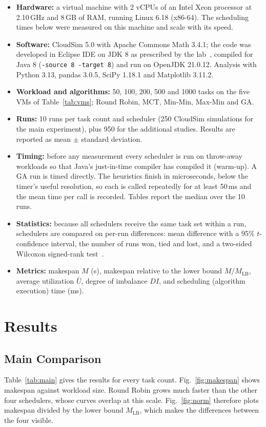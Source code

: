 \documentclass[journal,onecolumn,12pt]{IEEEtran}
\newcommand{\MLB}{M_{\mathrm{LB}}}
\newcommand{\Ubar}{\bar{U}}
\begin{document}
\begin{itemize}
\item \textbf{Hardware:} a virtual machine with 2 vCPUs of an Intel Xeon processor at 2.10\,GHz and 8\,GB of RAM, running Linux 6.18 (x86-64). The scheduling times below were measured on this machine and scale with its speed.
\item \textbf{Software:} CloudSim 5.0 with Apache Commons Math 3.4.1; the code was developed in Eclipse IDE on JDK 8 as prescribed by the lab~\cite{panda}, compiled for Java 8 (\texttt{-source 8 -target 8}) and run on OpenJDK 21.0.12. Analysis with Python 3.13, pandas 3.0.5, SciPy 1.18.1 and Matplotlib 3.11.2.
\item \textbf{Workload and algorithms:} 50, 100, 200, 500 and 1000 tasks on the five VMs of Table~\ref{tab:vms}; Round Robin, MCT, Min-Min, Max-Min and GA.
\item \textbf{Runs:} 10 runs per task count and scheduler (250 CloudSim simulations for the main experiment), plus 950 for the additional studies. Results are reported as mean $\pm$ standard deviation.
\item \textbf{Timing:} before any measurement every scheduler is run on throw-away workloads so that Java's just-in-time compiler has compiled it (warm-up). A GA run is timed directly. The heuristics finish in microseconds, below the timer's useful resolution, so each is called repeatedly for at least 50\,ms and the mean time per call is recorded. Tables report the median over the 10 runs.
\item \textbf{Statistics:} because all schedulers receive the same task set within a run, schedulers are compared on per-run differences: mean difference with a 95\% $t$-confidence interval, the number of runs won, tied and lost, and a two-sided Wilcoxon signed-rank test~\cite{wilcoxon}.
\item \textbf{Metrics:} makespan $M$ (s), makespan relative to the lower bound $M/\MLB$, average utilization $\Ubar$, degree of imbalance $DI$, and scheduling (algorithm execution) time (ms).
\end{itemize}

\section{Results}\label{sec:results}

\subsection{Main Comparison}
Table~\ref{tab:main} gives the results for every task count. Fig.~\ref{fig:makespan} shows makespan against workload size. Round Robin grows much faster than the other four schedulers, whose curves overlap at this scale. Fig.~\ref{fig:norm} therefore plots makespan divided by the lower bound $\MLB$, which makes the differences between the four visible.
\end{document}
